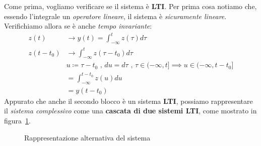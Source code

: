 Come prima, vogliamo verificare se il sistema è \textbf{LTI}. 
Per prima cosa notiamo che, essendo l'integrale un 
\textit{operatore lineare}, il sistema è \textit{sicuramente lineare}. 
Verifichiamo allora se è anche \textit{tempo invariante}:
\[
    \begin{aligned}
        z(t) &\longrightarrow y(t) = \int_{-\infty}^t z(\tau ) d \tau \\ 
        z(t-t_{0}) &\longrightarrow \int_{-\infty}^{t} z(\tau -t_{0}) d \tau \\
                   & u \coloneqq \tau - t_{0} \text{ , } du = d\tau 
                   \text{ , } \tau \in (-\infty, t] \implies u \in (-\infty, t-t_{0}] \\ 
                   &= \int_{-\infty}^{t-t_{0}} z(u) du \\ 
                   &= y(t-t_{0})
    \end{aligned}
\]
Appurato che anche il secondo blocco è un sistema \textbf{LTI}, possiamo
rappresentare il \textit{sistema complessivo} come una \textbf{cascata di due sistemi LTI},
come mostrato in figura~\ref{fig:Es_01_03_Esercizio1_RappresentazioneAlternativaSistema}.

\begin{figure}[!ht]
    \centering
    \caption{Rappresentazione alternativa del sistema}
    \label{fig:Es_01_03_Esercizio1_RappresentazioneAlternativaSistema}
\end{figure}

